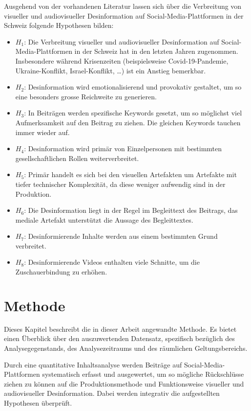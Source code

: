 \documentclass[12pt,a4paper]{article}        %
\begin{document}
Ausgehend von der vorhandenen Literatur lassen sich über die Verbreitung von visueller und audiovisueller Desinformation auf Social-Media-Plattformen in der Schweiz folgende Hypothesen bilden:
\begin{itemize}
  \item \textbf{\(H_1\)}: Die Verbreitung visueller und audiovisueller Desinformation auf Social-Media-Plattformen in der Schweiz hat in den letzten Jahren zugenommen. Insbesondere während Krisenzeiten (beispielsweise Covid-19-Pandemie, Ukraine-Konflikt, Israel-Konflikt, …) ist ein Anstieg bemerkbar.
  \item \textbf{\(H_2\)}: Desinformation wird emotionalisierend und provokativ gestaltet, um so eine besonders grosse Reichweite zu generieren.
  \item \textbf{\(H_3\)}:  In Beiträgen werden spezifische Keywords gesetzt, um so möglichst viel Aufmerksamkeit auf den Beitrag zu ziehen. Die gleichen Keywords tauchen immer wieder auf.
  \item \textbf{\(H_4\)}:  Desinformation wird primär von Einzelpersonen mit bestimmten gesellschaftlichen Rollen weiterverbreitet.
  \item \textbf{\(H_5\)}:  Primär handelt es sich bei den visuellen Artefakten um Artefakte mit tiefer technischer Komplexität, da diese weniger aufwendig sind in der Produktion.
  \item \textbf{\(H_6\)}:  Die Desinformation liegt in der Regel im Begleittext des Beitrags, das mediale Artefakt unterstützt die Aussage des Begleittextes.
  \item \textbf{\(H_7\)}:  Desinformierende Inhalte werden aus einem bestimmten Grund verbreitet.
  \item \textbf{\(H_8\)}:  Desinformierende Videos enthalten viele Schnitte, um die Zuschauerbindung zu erhöhen.
\end{itemize}

\pagebreak
\section{Methode}
\label{sec:method}
Dieses Kapitel beschreibt die in dieser Arbeit angewandte Methode. Es bietet einen Überblick über den auszuwertenden Datensatz, spezifisch bezüglich des Analysegegenstands, des Analysezeitraums und des räumlichen Geltungsbereichs.

Durch eine quantitative Inhaltsanalyse werden Beiträge auf Social-Media-Plattformen systematisch erfasst und ausgewertet, um so mögliche Rückschlüsse ziehen zu können auf die Produktionsmethode und Funktionsweise visueller und audiovisueller Desinformation. Dabei werden integrativ \parencite[13]{oehmer-pedrazzi_standardisierte_2023} die aufgestellten Hypothesen überprüft.
\end{document}

